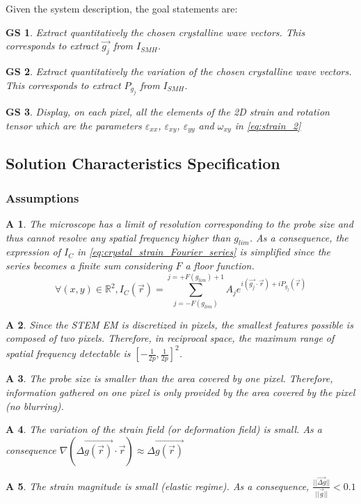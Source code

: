 \documentclass[12pt]{article}
\newtheorem{GS}{GS}
\newtheorem{A}{A}
\begin{document}
\noindent Given the system description, the goal statements are:
\begin{GS}
\normalfont Extract quantitatively the chosen crystalline wave vectors. This corresponds to extract $\vec{g_{j}}$ from $I_{SMH}$.
\label{GS_1}
\end{GS}
\begin{GS}
\normalfont Extract quantitatively the variation of the chosen crystalline wave vectors. This corresponds to extract $P_{g_{j}}$ from $I_{SMH}$.
\label{GS_2}
\end{GS}
\begin{GS}
\normalfont Display, on each pixel, all the elements of the 2D strain and rotation tensor which are the parameters $\varepsilon_{xx}$, $\varepsilon_{xy}$, $\varepsilon_{yy}$ and $\omega_{xy}$ in \cref{eq:strain_2}
\label{GS_3}
\end{GS}

\subsection{Solution Characteristics Specification}


\subsubsection{Assumptions}

\begin{A}
\normalfont The microscope has a limit of resolution corresponding to the probe size and thus cannot resolve any spatial frequency higher than $g_{lim}$. As a consequence, the expression of $I_C$ in \cref{eq:crystal_strain_Fourier_series} is simplified since the series becomes a finite sum considering $F$ a floor function.
\begin{equation}
\forall (x,y) \in \mathbb{R}^{2},I_C(\vec{r})=\sum_{j=-F(g_{lim})}^{j=+F(g_{lim})+1}A_je^{i(\vec{g_j}\cdot\vec{r})+iP_{g_{j}}(\vec{r})}
\end{equation}
\label{A_1}
\end{A}
\begin{A}
\normalfont Since the STEM EM is discretized in pixels, the smallest features possible is composed of two pixels. Therefore, in reciprocal space, the maximum range of spatial frequency detectable is $[-\frac{1}{2p},\frac{1}{2p}]^{2}$.
\label{A_2}
\end{A}
\begin{A}
\normalfont The probe size is smaller than the area covered by one pixel. Therefore, information gathered on one pixel is only provided by the area covered by the pixel (no blurring).
\label{A_3}
\end{A}
\begin{A}
\normalfont The variation of the strain field (or deformation field) is small. As a consequence $\nabla(\Delta \overrightarrow{g(\vec{r})}\cdot\vec{r})\approx\Delta \overrightarrow{g(\vec{r})}$
\label{A_4}
\end{A}
\begin{A}
\normalfont The strain magnitude is small (elastic regime). As a consequence, $\frac{||\vec{\Delta g}||}{||\vec{g}||}<0.1$
\label{A_5}
\end{A}
\end{document}
